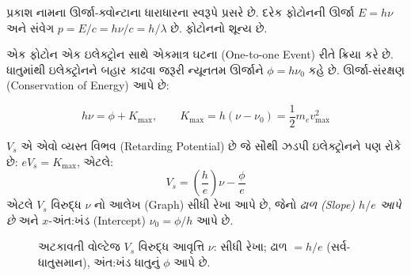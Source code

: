 \begin{pramey}[પ્રકાશ ક્વોન્ટમ (Photon)]
પ્રકાશ  નામના ઊર્જા-ક્વોન્ટાના ધારાધારના સ્વરૂપે પ્રસરે છે. દરેક ફોટોનની ઊર્જા
$E=h\nu$ અને સંવેગ $p=E/c=h\nu/c=h/\lambda$ છે. ફોટોનનો  શૂન્ય છે.
\end{pramey}

એક ફોટોન એક ઇલેક્ટ્રોન સાથે એકમાત્ર ઘટના (One-to-one Event) રીતે ક્રિયા કરે છે. ધાતુમાંથી
ઇલેક્ટ્રોનને બહાર કાઢવા જરૂરી ન્યૂનતમ ઊર્જાને  $\phi=h\nu_0$ કહે છે.
ઊર્જા-સંરક્ષણ (Conservation of Energy) આપે છે:
\begin{niyam}
\begin{equation}
  \boxed{\;h\nu=\phi+K_{\max},\qquad K_{\max}=h(\nu-\nu_0)=\frac12 m_e v_{\max}^{2}\;}
\end{equation}
\end{niyam}

 $V_s$ એ એવો વ્યસ્ત વિભવ (Retarding Potential) છે જે
સૌથી ઝડપી ઇલેક્ટ્રોનને પણ રોકે છે: $eV_s=K_{\max}$, એટલે:
\begin{equation}
  V_s=\left(\frac{h}{e}\right)\nu-\frac{\phi}{e}
  \label{eq:stopping}
\end{equation}
એટલે $V_s$ વિરુદ્ધ $\nu$ નો આલેખ (Graph) સીધી રેખા આપે છે, જેનો \emph{ઢાળ (Slope) $h/e$ આપે છે}
અને $x$-અંત:ખંડ (Intercept) $\nu_0=\phi/h$ આપે છે.

\begin{figure}[ht]
\centering
{}
\caption{અટકાવતી વોલ્ટેજ $V_s$ વિરુદ્ધ આવૃત્તિ $\nu$: સીધી રેખા; ઢાળ $=h/e$
(સર્વ-ધાતુસમાન), અંત:ખંડ ધાતુનું $\phi$ આપે છે.}
\label{fig:photoelectric}
\end{figure}

